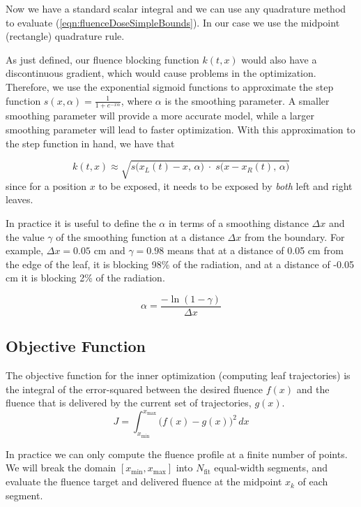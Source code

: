 \documentclass[12pt]{article}
\begin{document}
Now we have a standard scalar integral and we can use any quadrature method to evaluate (\ref{eqn:fluenceDoseSimpleBounds}).
In our case we use the midpoint (rectangle) quadrature rule. 

As just defined, our fluence blocking function $k(t,x)$
would also have a discontinuous gradient, which would cause problems in the optimization.
Therefore, we use the exponential sigmoid functions to approximate the step function
$s(x, \alpha) = \frac{1}{1 + e^{-x \alpha}}$, where $\alpha$ is the smoothing parameter. A smaller smoothing parameter will provide a more accurate model, while a larger smoothing parameter will lead to faster optimization. With this approximation to the step function in hand, we have that

\begin{equation}
  k(t, x) \approx \sqrt{s\big(x_L(t) -x, \, \alpha\big) \; \cdot \; s\big(x -x_R(t), \, \alpha\big)}
\end{equation}
since for a position $x$ to be exposed, it needs to be exposed by {\em both} left and right leaves.

In practice it is useful to define the $\alpha$ in terms of a smoothing distance $\Delta x$ and the
value $\gamma$ of the smoothing function at a distance $\Delta x$ from the boundary. For example, $\Delta x = 0.05$ cm and $\gamma = 0.98$ means that at a distance of 0.05 cm from the edge of the leaf, it is blocking 98\% of the radiation, and at a distance of -0.05 cm it is blocking 2\% of the radiation.

\begin{equation}
  \alpha = \frac{-\ln(1-\gamma)}{\Delta x}
  \label{eqn:SmoothingDistanceParameter}
\end{equation}

\subsection{Objective Function}

The objective function for the inner optimization (computing leaf trajectories)
is the integral of the error-squared between the desired fluence $f(x)$ and the fluence that
is delivered by the current set of trajectories, $g(x)$.
\begin{equation}
  J = \int_{x_\text{min}}^{x_\text{max}} \! \bigg( f(x) - g(x) \bigg)^2 \,dx
  \label{eqn:continuousFittingObjective}
\end{equation}

In practice we can only compute the fluence profile at a finite number of points. We will break the domain $[x_\text{min}, x_\text{max}]$ into $N_\text{fit}$ equal-width segments,
and evaluate the fluence target and delivered fluence at the midpoint $x_k$ of each segment.
\end{document}
